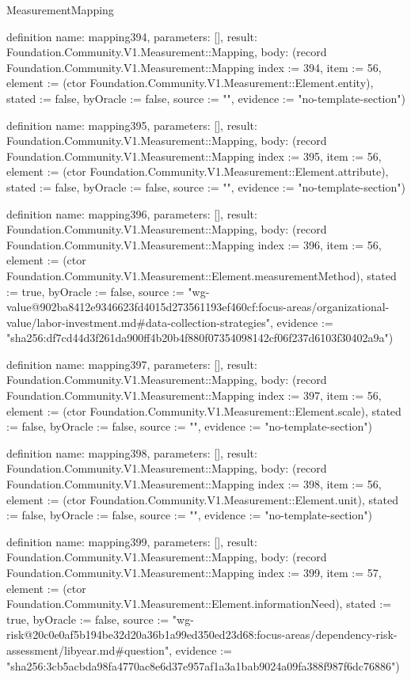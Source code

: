 \begin{lexlean}{MeasurementMapping}
\begin{semanticmodule}
definition{
  name: mapping394,
  parameters: [],
  result: Foundation.Community.V1.Measurement::Mapping,
  body: (record Foundation.Community.V1.Measurement::Mapping {index := 394, item := 56, element := (ctor Foundation.Community.V1.Measurement::Element.entity), stated := false, byOracle := false, source := "", evidence := "no-template-section"})
}

definition{
  name: mapping395,
  parameters: [],
  result: Foundation.Community.V1.Measurement::Mapping,
  body: (record Foundation.Community.V1.Measurement::Mapping {index := 395, item := 56, element := (ctor Foundation.Community.V1.Measurement::Element.attribute), stated := false, byOracle := false, source := "", evidence := "no-template-section"})
}

definition{
  name: mapping396,
  parameters: [],
  result: Foundation.Community.V1.Measurement::Mapping,
  body: (record Foundation.Community.V1.Measurement::Mapping {index := 396, item := 56, element := (ctor Foundation.Community.V1.Measurement::Element.measurementMethod), stated := true, byOracle := false, source := "wg-value@902ba8412e9346623fd4015d273561193ef460cf:focus-areas/organizational-value/labor-investment.md#data-collection-strategies", evidence := "sha256:df7cd44d3f261da900ff4b20b4f880f07354098142cf06f237d6103f30402a9a"})
}

definition{
  name: mapping397,
  parameters: [],
  result: Foundation.Community.V1.Measurement::Mapping,
  body: (record Foundation.Community.V1.Measurement::Mapping {index := 397, item := 56, element := (ctor Foundation.Community.V1.Measurement::Element.scale), stated := false, byOracle := false, source := "", evidence := "no-template-section"})
}

definition{
  name: mapping398,
  parameters: [],
  result: Foundation.Community.V1.Measurement::Mapping,
  body: (record Foundation.Community.V1.Measurement::Mapping {index := 398, item := 56, element := (ctor Foundation.Community.V1.Measurement::Element.unit), stated := false, byOracle := false, source := "", evidence := "no-template-section"})
}

definition{
  name: mapping399,
  parameters: [],
  result: Foundation.Community.V1.Measurement::Mapping,
  body: (record Foundation.Community.V1.Measurement::Mapping {index := 399, item := 57, element := (ctor Foundation.Community.V1.Measurement::Element.informationNeed), stated := true, byOracle := false, source := "wg-risk@20c0e0af5b194be32d20a36b1a99ed350ed23d68:focus-areas/dependency-risk-assessment/libyear.md#question", evidence := "sha256:3cb5acbda98fa4770ac8e6d37e957af1a3a1bab9024a09fa388f987f6dc76886"})
}


\end{semanticmodule}
\end{lexlean}

